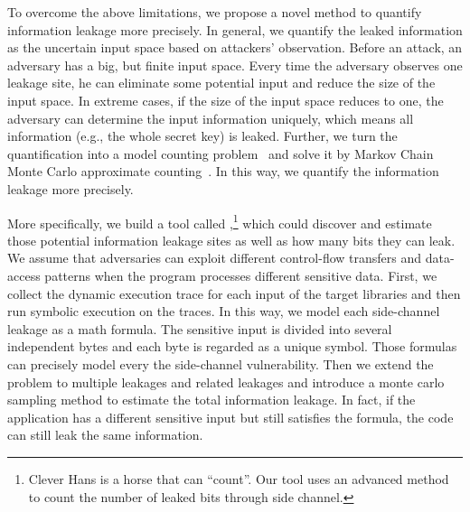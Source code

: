 To overcome the above limitations, we propose a novel method
to quantify information leakage more precisely. 
In general, we quantify the leaked information as the uncertain input space based on attackers' observation.
Before an attack, an adversary has a big, but finite input space.
Every time the adversary observes one leakage site, he can eliminate some potential input and
reduce the size of the input space. 
In extreme cases, if the size of the input space reduces to one, 
the adversary can determine the input information uniquely, which means all information
(e.g., the whole secret key) is leaked. 
Further, we turn the quantification into a model counting problem~\cite{bibid} 
and solve it by Markov Chain Monte Carlo approximate counting~\cite{bibid}. 
In this way, we quantify the information leakage more precisely.


More specifically, we build a tool called \tool{},\footnote{Clever Hans is a horse that can ``count''.
Our tool uses an advanced method to count the number of leaked bits through side channel.}
which could discover and estimate those potential information leakage sites 
as well as how many bits they can leak. 
We assume that adversaries can exploit different control-flow transfers and data-access patterns when 
the program processes different sensitive data. 
First, we collect the dynamic execution trace for each input of the target libraries 
and then run symbolic execution on the traces. 
In this way, we model each side-channel leakage as a math formula. 
The sensitive input is divided into several independent bytes and each byte is regarded as 
a unique symbol. Those formulas can precisely model every the side-channel vulnerability.
Then we extend the problem to multiple leakages and related leakages
and introduce a monte carlo sampling method to estimate the total information leakage.
In fact, if the application has a different sensitive input but still satisfies the formula, 
the code can still leak the same information. 



